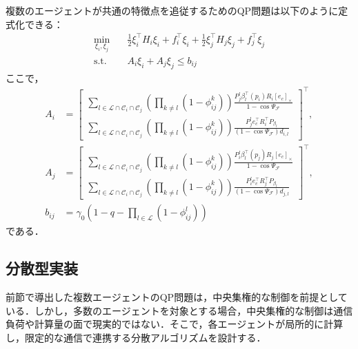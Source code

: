 複数のエージェントが共通の特徴点を追従するためのQP問題は以下のように定式化できる：
\begin{equation}
\begin{aligned}
\min_{\xi_i, \xi_j} \quad & \frac{1}{2}\xi_i^\top H_i \xi_i + f_i^\top \xi_i + \frac{1}{2}\xi_j^\top H_j \xi_j + f_j^\top \xi_j \\
\mathrm{s.t.} \quad & A_i \xi_i + A_j \xi_j \leq b_{ij}
\label{eq:common_cbf_qp}
\end{aligned}
\end{equation}
ここで，
\begin{equation}
\begin{aligned}
A_i &= \begin{bmatrix}
\sum_{l \in \mathcal{L} \cap \mathcal{C}_i \cap \mathcal{C}_j}\left(\prod_{k \neq l}(1 - \phi_{ij}^k)\right) \frac{P_j^l\beta_l^\top(p_i) R_i [e_c]_\times}{1 - \cos\Psi_\mathcal{F}} \\
\sum_{l \in \mathcal{L} \cap \mathcal{C}_i \cap \mathcal{C}_j}\left(\prod_{k \neq l}(1 - \phi_{ij}^k)\right)\frac{P_j^le_c^\top R_i^\top P_{\beta_l}}{(1 - \cos\Psi_\mathcal{F})d_{i,l}}
\end{bmatrix}^\top, \\
A_j &= \begin{bmatrix}
\sum_{l \in \mathcal{L} \cap \mathcal{C}_i \cap \mathcal{C}_j}\left(\prod_{k \neq l}(1 - \phi_{ij}^k)\right) \frac{P_i^l\beta_l^\top(p_j) R_j [e_c]_\times}{1 - \cos\Psi_\mathcal{F}} \\
\sum_{l \in \mathcal{L} \cap \mathcal{C}_i \cap \mathcal{C}_j}\left(\prod_{k \neq l}(1 - \phi_{ij}^k)\right)\frac{P_i^le_c^\top R_j^\top P_{\beta_l}}{(1 - \cos\Psi_\mathcal{F})d_{j,l}}
\end{bmatrix}^\top, \\
b_{ij} &= \gamma_0 \left(1 - q - \prod_{l \in \mathcal{L}}(1 - \phi_{ij}^l)\right)
\label{eq:common_cbf_qp_params}
\end{aligned}
\end{equation}
である．

\subsection{分散型実装}

前節で導出した複数エージェントのQP問題は，中央集権的な制御を前提としている．しかし，多数のエージェントを対象とする場合，中央集権的な制御は通信負荷や計算量の面で現実的ではない．そこで，各エージェントが局所的に計算し，限定的な通信で連携する分散アルゴリズムを設計する．

